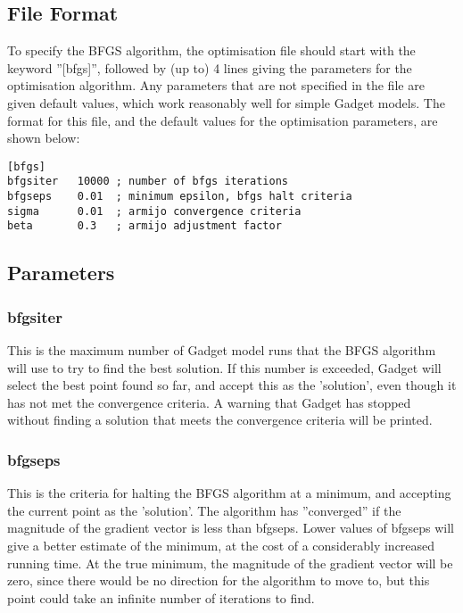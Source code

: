 \documentclass[10pt,twoside]{book}
\begin{document}
\subsection{File Format}\label{subsec:bfgsfile}
To specify the BFGS algorithm, the optimisation file should start with the keyword ''[bfgs]'', followed by (up to) 4 lines giving the parameters for the optimisation algorithm.  Any parameters that are not specified in the file are given default values, which work reasonably well for simple Gadget models.  The format for this file, and the default values for the optimisation parameters, are shown below:

{\small\begin{verbatim}
[bfgs]
bfgsiter   10000 ; number of bfgs iterations
bfgseps    0.01  ; minimum epsilon, bfgs halt criteria
sigma      0.01  ; armijo convergence criteria
beta       0.3   ; armijo adjustment factor
\end{verbatim}}

\subsection{Parameters}\label{subsec:bfgspar}
\subsubsection{bfgsiter}
This is the maximum number of Gadget model runs that the BFGS algorithm will use to try to find the best solution.  If this number is exceeded, Gadget will select the best point found so far, and accept this as the 'solution', even though it has not met the convergence criteria.  A warning that Gadget has stopped without finding a solution that meets the convergence criteria will be printed.

\subsubsection{bfgseps}
This is the criteria for halting the BFGS algorithm at a minimum, and accepting the current point as the 'solution'.  The algorithm has ''converged'' if the magnitude of the gradient vector is less than bfgseps.  Lower values of bfgseps will give a better estimate of the minimum, at the cost of a considerably increased running time.  At the true minimum, the magnitude of the gradient vector will be zero, since there would be no direction for the algorithm to move to, but this point could take an infinite number of iterations to find.
\end{document}
